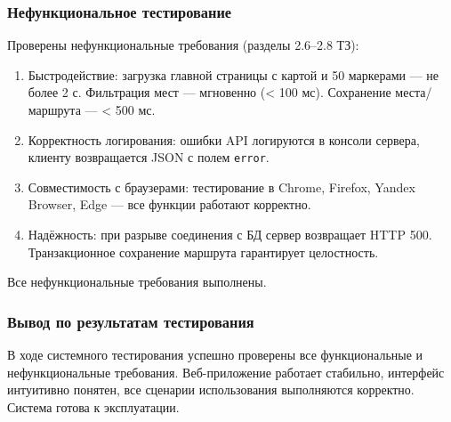 \subsubsection{Нефункциональное тестирование}

Проверены нефункциональные требования (разделы 2.6–2.8 ТЗ):

\begin{enumerate}
	\item Быстродействие: загрузка главной страницы с картой и 50 маркерами — не более 2 с. Фильтрация мест — мгновенно (< 100 мс). Сохранение места/маршрута — < 500 мс.
	\item Корректность логирования: ошибки API логируются в консоли сервера, клиенту возвращается JSON с полем \texttt{error}.
	\item Совместимость с браузерами: тестирование в Chrome, Firefox, Yandex Browser, Edge — все функции работают корректно.
	\item Надёжность: при разрыве соединения с БД сервер возвращает HTTP 500. Транзакционное сохранение маршрута гарантирует целостность.
\end{enumerate}

Все нефункциональные требования выполнены.

\subsubsection{Вывод по результатам тестирования}

В ходе системного тестирования успешно проверены все функциональные и нефункциональные требования. Веб-приложение работает стабильно, интерфейс интуитивно понятен, все сценарии использования выполняются корректно. Система готова к эксплуатации.